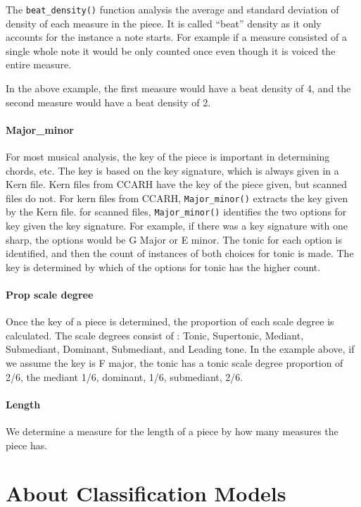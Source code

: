\documentclass[12pt,twoside]{reedthesis}
\theoremstyle{definition}
\theoremstyle{definition}
\theoremstyle{definition}
\theoremstyle{remark}
\begin{document}
The \texttt{beat\_density()} function analysis the average and standard
deviation of density of each measure in the piece. It is called ``beat''
density as it only accounts for the instance a note starts. For example
if a measure consisted of a single whole note it would be only counted
once even though it is voiced the entire measure.

In the above example, the first measure would have a beat density of 4,
and the second measure would have a beat density of 2.

\subsubsection{Major\_minor}\label{major_minor}

For most musical analysis, the key of the piece is important in
determining chords, etc. The key is based on the key signature, which is
always given in a Kern file. Kern files from CCARH have the key of the
piece given, but scanned files do not. For kern files from CCARH,
\texttt{Major\_minor()} extracts the key given by the Kern file. for
scanned files, \texttt{Major\_minor()} identifies the two options for
key given the key signature. For example, if there was a key signature
with one sharp, the options would be G Major or E minor. The tonic for
each option is identified, and then the count of instances of both
choices for tonic is made. The key is determined by which of the options
for tonic has the higher count.

\subsubsection{Prop scale degree}\label{prop-scale-degree}

Once the key of a piece is determined, the proportion of each scale
degree is calculated. The scale degrees consist of : Tonic, Supertonic,
Mediant, Submediant, Dominant, Submediant, and Leading tone. In the
example above, if we assume the key is F major, the tonic has a tonic
scale degree proportion of 2/6, the mediant 1/6, dominant, 1/6,
submediant, 2/6.

\subsubsection{Length}\label{length}

We determine a measure for the length of a piece by how many measures
the piece has.

\chapter{About Classification Models}\label{about-classification-models}
\end{document}

